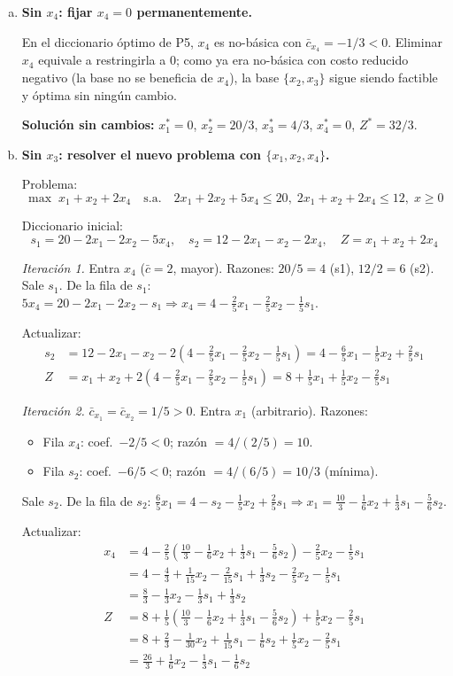 \documentclass{article}
\begin{document}
\begin{enumerate}[a)]

\item \textbf{Sin $x_4$: fijar $x_4=0$ permanentemente.}

En el diccionario óptimo de P5, $x_4$ es no-básica con $\bar{c}_{x_4}=-1/3<0$. Eliminar $x_4$ equivale a restringirla a $0$; como ya era no-básica con costo reducido negativo (la base no se beneficia de $x_4$), la base $\{x_2,x_3\}$ sigue siendo factible y óptima sin ningún cambio.

\textbf{Solución sin cambios:} $x_1^*=0$, $x_2^*=20/3$, $x_3^*=4/3$, $x_4^*=0$, $Z^*=32/3$.

\item \textbf{Sin $x_3$: resolver el nuevo problema con $\{x_1,x_2,x_4\}$.}

Problema:
$$\max\;x_1+x_2+2x_4\quad\text{s.a.}\quad2x_1+2x_2+5x_4\leq20,\;2x_1+x_2+2x_4\leq12,\;x\geq0$$

Diccionario inicial:
$$s_1=20-2x_1-2x_2-5x_4,\quad s_2=12-2x_1-x_2-2x_4,\quad Z=x_1+x_2+2x_4$$

\textit{Iteración 1.} Entra $x_4$ ($\bar{c}=2$, mayor). Razones: $20/5=4$ (s1), $12/2=6$ (s2). Sale $s_1$.
De la fila de $s_1$: $5x_4=20-2x_1-2x_2-s_1 \Rightarrow x_4=4-\tfrac{2}{5}x_1-\tfrac{2}{5}x_2-\tfrac{1}{5}s_1$.

Actualizar:
\begin{align*}
s_2&=12-2x_1-x_2-2(4-\tfrac{2}{5}x_1-\tfrac{2}{5}x_2-\tfrac{1}{5}s_1)=4-\tfrac{6}{5}x_1-\tfrac{1}{5}x_2+\tfrac{2}{5}s_1\\
Z&=x_1+x_2+2(4-\tfrac{2}{5}x_1-\tfrac{2}{5}x_2-\tfrac{1}{5}s_1)=8+\tfrac{1}{5}x_1+\tfrac{1}{5}x_2-\tfrac{2}{5}s_1
\end{align*}

\textit{Iteración 2.} $\bar{c}_{x_1}=\bar{c}_{x_2}=1/5>0$. Entra $x_1$ (arbitrario). Razones:
\begin{itemize}
  \item Fila $x_4$: coef.\ $-2/5<0$; razón $=4/(2/5)=10$.
  \item Fila $s_2$: coef.\ $-6/5<0$; razón $=4/(6/5)=10/3$ (mínima).
\end{itemize}
Sale $s_2$. De la fila de $s_2$: $\tfrac{6}{5}x_1=4-s_2-\tfrac{1}{5}x_2+\tfrac{2}{5}s_1 \Rightarrow x_1=\tfrac{10}{3}-\tfrac{1}{6}x_2+\tfrac{1}{3}s_1-\tfrac{5}{6}s_2$.

Actualizar:
\begin{align*}
x_4&=4-\tfrac{2}{5}(\tfrac{10}{3}-\tfrac{1}{6}x_2+\tfrac{1}{3}s_1-\tfrac{5}{6}s_2)-\tfrac{2}{5}x_2-\tfrac{1}{5}s_1\\
&=4-\tfrac{4}{3}+\tfrac{1}{15}x_2-\tfrac{2}{15}s_1+\tfrac{1}{3}s_2-\tfrac{2}{5}x_2-\tfrac{1}{5}s_1\\
&=\tfrac{8}{3}-\tfrac{1}{3}x_2-\tfrac{1}{3}s_1+\tfrac{1}{3}s_2\\
Z&=8+\tfrac{1}{5}(\tfrac{10}{3}-\tfrac{1}{6}x_2+\tfrac{1}{3}s_1-\tfrac{5}{6}s_2)+\tfrac{1}{5}x_2-\tfrac{2}{5}s_1\\
&=8+\tfrac{2}{3}-\tfrac{1}{30}x_2+\tfrac{1}{15}s_1-\tfrac{1}{6}s_2+\tfrac{1}{5}x_2-\tfrac{2}{5}s_1\\
&=\tfrac{26}{3}+\tfrac{1}{6}x_2-\tfrac{1}{3}s_1-\tfrac{1}{6}s_2
\end{align*}


\end{enumerate}
\end{document}
